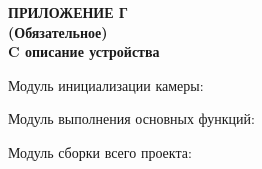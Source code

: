 \clearpage
{}%
\par

\normalsize
\begin{center}
  \textbf{ПРИЛОЖЕНИЕ Г} \\
  \textbf{(Обязательное)} \\
  \textbf{C описание устройства}
\end{center}

Модуль инициализации камеры:



Модуль выполнения основных функций:



Модуль сборки всего проекта:



\pdfpagewidth=210mm
\pdfpageheight=297mm

\clearpage
